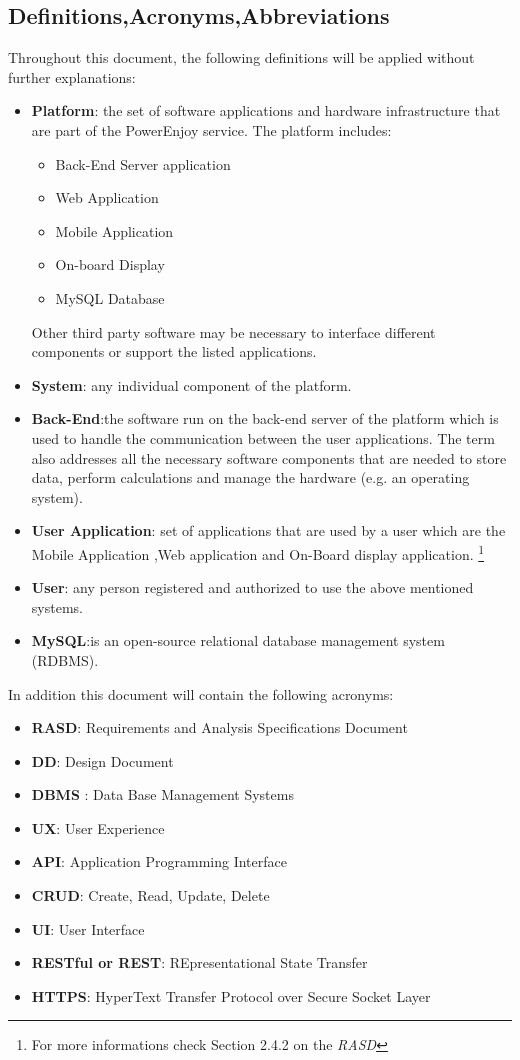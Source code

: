 \subsection{Definitions,Acronyms,Abbreviations}
Throughout this document, the following definitions will be applied without
further explanations:
\begin{itemize}
\item \textbf{Platform}: the set of software applications and hardware infrastructure that are part of the PowerEnjoy service. The platform includes:
	\begin{itemize}
	\item Back-End Server application
	\item Web Application
	\item Mobile Application
	\item On-board Display
	\item MySQL Database
	\end{itemize}
	Other third party software may be necessary to interface different components 	
	or support the listed applications.
\item \textbf{System}: any individual component of the platform.
\item \textbf{Back-End}:the software run on the back-end server of the platform which is used to handle the communication between the user applications. The
term also addresses all the necessary software components that are needed
to store data, perform calculations and manage the hardware (e.g. an operating
system).
\item \textbf{User Application}: set of applications that are used by a user which are the Mobile Application ,Web application and On-Board display application.
\footnote{For more informations check Section 2.4.2 on the \emph{RASD}} 
\item \textbf{User}: any person registered and authorized to use the above mentioned systems.

\item \textbf{MySQL}:is an open-source relational database management system (RDBMS).
\end{itemize}
In addition this document will contain the following acronyms:
\begin{itemize}
\item \textbf{RASD}: Requirements and Analysis Specifications Document
\item \textbf{DD}: Design Document
\item \textbf{DBMS} : Data Base Management Systems
\item \textbf{UX}: User Experience
\item \textbf{API}: Application Programming Interface 
\item \textbf{CRUD}: Create, Read, Update, Delete 
\item \textbf{UI}: User Interface
\item \textbf{RESTful or REST}: REpresentational State Transfer
\item \textbf{HTTPS}: HyperText Transfer Protocol over Secure Socket Layer
\end{itemize}


